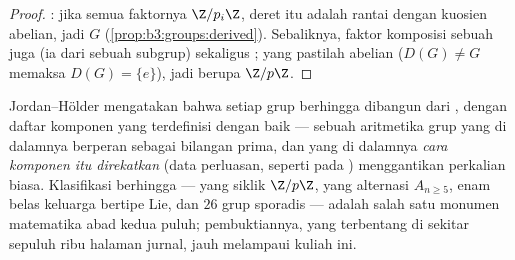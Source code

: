 \begin{proof}
: jika semua faktornya $\Z/p_i\Z$, deret itu adalah rantai
dengan kuosien abelian, jadi $G$ 
(\cref{prop:b3:groups:derived}). Sebaliknya, faktor komposisi
sebuah  juga  (ia  dari sebuah subgrup) sekaligus
;  yang  pastilah abelian ($D(G) \ne G$ memaksa
$D(G) = \{e\}$), jadi berupa $\Z/p\Z$.
\end{proof}

\begin{remark}\label{rem:b3:groups:jhmeaning}
Jordan--Hölder mengatakan bahwa setiap grup berhingga dibangun dari , dengan daftar komponen yang terdefinisi dengan baik --- sebuah aritmetika grup
yang di dalamnya  berperan sebagai bilangan prima, dan yang di dalamnya \emph{cara
komponen itu direkatkan} (data perluasan, seperti pada )
menggantikan perkalian biasa. Klasifikasi 
berhingga --- yang siklik $\Z/p\Z$, yang alternasi $A_{n \geq
5}$, enam belas keluarga bertipe Lie, dan $26$ grup sporadis --- adalah
salah satu monumen matematika abad kedua puluh; pembuktiannya,
yang terbentang di sekitar sepuluh ribu halaman jurnal, jauh melampaui
kuliah ini.
\end{remark}

